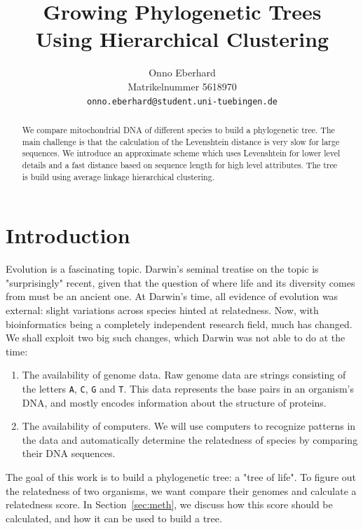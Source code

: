 \documentclass{article}
\title{Growing Phylogenetic Trees\\ Using Hierarchical Clustering}
\author{%
  Onno Eberhard\\
  Matrikelnummer 5618970\\
  \texttt{onno.eberhard@student.uni-tuebingen.de} \\
}
\begin{document}
\maketitle

\begin{abstract}
    We compare mitochondrial DNA of different species to build a phylogenetic tree. The main challenge is that the calculation of the Levenshtein distance is very slow for large sequences. We introduce an approximate scheme which uses Levenshtein for lower level details and a fast distance based on sequence length for high level attributes. The tree is build using average linkage hierarchical clustering.
\end{abstract}

\section{Introduction}
Evolution is a fascinating topic. Darwin's seminal treatise on the topic \parencite{darwin1964origin} is "surprisingly" recent, given that the question of where life and its diversity comes from must be an ancient one. %
At Darwin's time, all evidence of evolution was external: slight variations across species hinted at relatedness. Now, with bioinformatics being a completely independent research field, much has changed. We shall exploit two big such changes, which Darwin was not able to do at the time:
\begin{enumerate}
    \item The availability of genome data. Raw genome data are strings consisting of the letters \texttt{A}, \texttt{C}, \texttt{G} and \texttt{T}. This data represents the base pairs in an organism's DNA, and mostly encodes information about the structure of proteins.
    \item The availability of computers. We will use computers to recognize patterns in the data and automatically determine the relatedness of species by comparing their DNA sequences.
\end{enumerate}
The goal of this work is to build a phylogenetic tree: a "tree of life". To figure out the relatedness of two organisms, we want compare their genomes and calculate a relatedness score. In Section~\ref{sec:meth}, we discuss how this score should be calculated, and how it can be used to build a tree.
\end{document}
